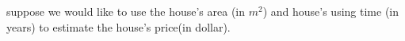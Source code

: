suppose we would like to use the house's area 
(in $m^2$) and house's using time (in years) 
to estimate the house's price(in dollar). 
